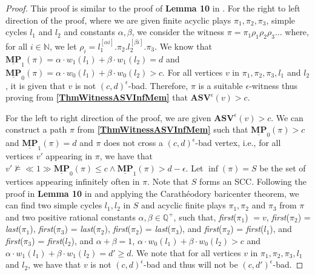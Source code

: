 \begin{proof}
This proof is similar to the proof of \textbf{Lemma 10} in \cite{FGR20}. 
For the right to left direction of the proof, where we are given finite acyclic plays $\pi_1, \pi_2, \pi_3$, simple cycles $l_1$ and $l_2$ and constants $\alpha, \beta$, we consider the witness $\pi = \pi_1\rho_1\rho_2\rho_3\dots$ where, for all $i \in \mathbb{N}$, we let $\rho_i = l_1^{[\alpha i]}.\pi_2.l_2^{[\beta i]}.\pi_3$. 
We know that $\underline{\mathbf{MP}}_1(\pi) = \alpha \cdot w_1(l_1) + \beta \cdot w_1(l_2) = d$ and $\underline{\mathbf{MP}}_0(\pi) = \alpha \cdot w_0(l_1) + \beta \cdot w_0(l_2) > c$. For all vertices $v$ in $\pi_1, \pi_2, \pi_3, l_1$ and $l_2$, it is given that $v$ is not $(c,d)^\epsilon$-bad. 
Therefore, $\pi$ is a suitable $\epsilon$-witness thus proving from \textbf{\cref{ThmWitnessASVInfMem}} that $\mathbf{ASV}^{\epsilon}(v) > c$.

For the left to right direction of the proof, we are given $\mathbf{ASV}^{\epsilon}(v) > c$. We can construct a path $\pi$ from \textbf{\cref{ThmWitnessASVInfMem}} such that $\underline{\mathbf{MP}}_0(\pi) > c$ and $\underline{\mathbf{MP}}_1(\pi) = d$ and $\pi$ does not cross a $(c,d)^{\epsilon}$-bad vertex, i.e., for all vertices $v'$ appearing in $\pi$, we have that $v' \nvDash \ll 1 \gg \underline{\mathbf{MP}}_0(\pi) \leqslant c \land \underline{\mathbf{MP}}_1(\pi) > d-\epsilon$. Let $\inf(\pi) = S$ be the set of vertices appearing infinitely often in $\pi$. Note that $S$ forms an SCC. 
Following the proof in \textbf{Lemma 10} in \cite{FGR20} and applying the Carathéodory baricenter theorem, we can find two simple cycles $l_1, l_2$ in $S$ and acyclic finite plays $\pi_1, \pi_2 $ and $\pi_3$ from $\pi$ and two positive rational constants $\alpha, \beta \in \mathbb{Q^+}$, such that, \textit{first}($\pi_1$) $ = v$, \textit{first}($\pi_2$) = \textit{last}($\pi_1$), \textit{first}($\pi_3$) = \textit{last}($\pi_2$), \textit{first}($\pi_2$) = \textit{last}($\pi_3$), and \textit{first}($\pi_2$) = \textit{first}($l_1$), and \textit{first}($\pi_3$) = \textit{first}($l_2$), and $\alpha + \beta = 1$, $\alpha \cdot w_0(l_1) + \beta \cdot w_0(l_2) > c$ and $\alpha \cdot w_1(l_1) + \beta \cdot w_1(l_2) = d' \geqslant d$. We note that for all vertices $v$ in $\pi_1, \pi_2, \pi_3, l_1$ and $l_2$, we have that $v$ is not $(c,d)^{\epsilon}$-bad and thus will not be $(c,d')^{\epsilon}$-bad.
\end{proof}